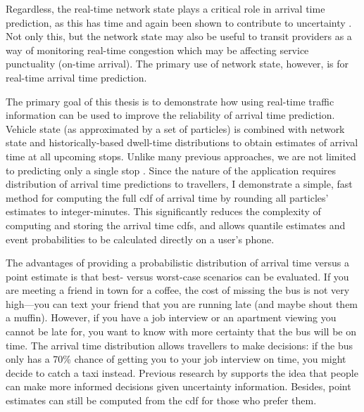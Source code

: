 Regardless, the real-time network state plays a critical role in arrival time prediction, as this has time and again been shown to contribute to uncertainty \citep{Shalaby_2004, Yu_2006, Yu_2010, Yu_2011, Julio_2016}. Not only this, but the network state may also be useful to transit providers as a way of monitoring real-time congestion which may be affecting service punctuality (on-time arrival). The primary use of network state, however, is for real-time arrival time prediction.


The primary goal of this thesis is to demonstrate how using real-time traffic information can be used to improve the reliability of arrival time prediction. Vehicle state (as approximated by a set of particles) is combined with network state and historically-based dwell-time distributions to obtain estimates of arrival time at all upcoming stops. Unlike many previous approaches, we are not limited to predicting only a single stop \citep{Yu_2011}. Since the nature of the application requires distribution of arrival time predictions to travellers, I demonstrate a simple, fast method for computing the full \gls{cdf} of arrival time by rounding all particles' estimates to integer-minutes. This significantly reduces the complexity of computing and storing the arrival time \glspl{cdf}, and allows quantile estimates and event probabilities to be calculated directly on a user's phone.


The advantages of providing a probabilistic distribution of arrival time versus a point estimate is that best- versus worst-case scenarios can be evaluated. If you are meeting a friend in town for a coffee, the cost of missing the bus is not very high---you can text your friend that you are running late (and maybe shout them a muffin). However, if you have a job interview or an apartment viewing you cannot be late for, you want to know with more certainty that the bus will be on time. The arrival time distribution allows travellers to make decisions: if the bus only has a 70\% chance of getting you to your job interview on time, you might decide to catch a taxi instead. Previous research by \citet{Fernandes_2018} supports the idea that people can make more informed decisions given uncertainty information. Besides, point estimates can still be computed from the \gls{cdf} for those who prefer them.


